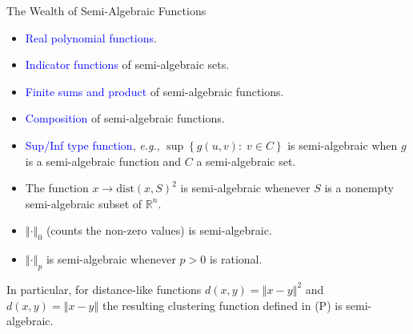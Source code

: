 \documentclass[9pt,handout]{beamer} %
\newcommand{\gap}{\vspace{0.1in}}
\newcommand{\eg}{{\em e.g.}, }
\newcommand{\rr}{\mathbb{R}} %
\newcommand{\norm}[1]{\left\Vert {#1} \right\Vert} %
\newcommand{\dist}{\mathrm{dist}} %
\begin{document}
    \begin{frame}{The Wealth of Semi-Algebraic Functions}
        \begin{itemize}[<+->]
        	\item \textcolor{blue}{Real polynomial functions}.
            \item \textcolor{blue}{Indicator functions} of semi-algebraic sets.
            \item \textcolor{blue}{Finite sums and product} of semi-algebraic functions. 
            \item \textcolor{blue}{Composition} of semi-algebraic functions.
            \item \textcolor{blue}{Sup/Inf type function}, \eg $\sup \left\{ g\left(u , 
            	v\right) : \; v \in C \right\}$ is semi-algebraic when $g$ is a semi-algebraic function and $C$ a semi-algebraic set.
             \item The function $x \to \dist\left(x , S\right)^{2}$ is semi-algebraic 
             	whenever $S$ is a nonempty semi-algebraic subset of $\rr^{n}$.
             \item $\norm{\cdot}_{0}$ (counts the non-zero values) is semi-algebraic.
             \item $\norm{\cdot}_{p}$ is semi-algebraic whenever $p > 0$ is rational.
        \end{itemize}
        \gap
		\pause
 		In particular, for distance-like functions $d(x,y)=\norm{x-y}^2$ and $d(x,y)=\norm{x-y}$ the resulting clustering function defined in (P) is semi-algebraic.
    \end{frame}
	
\end{document}
